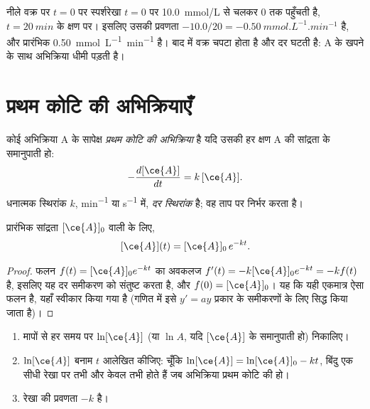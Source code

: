 \begin{example}[प्रारंभिक दर]\label{ex:g12:reaction-rates:initial}
नीले वक्र पर $t = 0$ पर स्पर्शरेखा
$t = 0$ पर \qty{10.0}{mmol/L} से चलकर $0$ तक पहुँचती है, $t = \qty{20}{min}$ के क्षण पर। इसलिए उसकी प्रवणता
$-10.0/20 = \qty{-0.50}{mmol.L^{-1}.min^{-1}}$ है, और प्रारंभिक
 \qty{0.50}{mmol.L^{-1}.min^{-1}} है। बाद में वक्र चपटा होता है
और दर घटती है: A के खपने के साथ अभिक्रिया धीमी पड़ती है।
\end{example}

\section{प्रथम कोटि की अभिक्रियाएँ}

\begin{definition}[प्रथम कोटि की अभिक्रिया, दर स्थिरांक]\label{def:g12:reaction-rates:first-order}
कोई अभिक्रिया A के सापेक्ष \emph{प्रथम कोटि की अभिक्रिया}
है यदि उसकी  हर क्षण A की सांद्रता के
समानुपाती हो:
\[
  -\frac{d[\ce{A}]}{dt} = k\,[\ce{A}] .
\]
धनात्मक स्थिरांक $k$, \si{min^{-1}} या \si{s^{-1}} में,
\emph{दर स्थिरांक} है; वह ताप पर निर्भर करता है।
\end{definition}

\begin{proposition}[चरघातांकी क्षय]\label{prop:g12:reaction-rates:exponential}
प्रारंभिक सांद्रता $[\ce{A}]_0$ वाली  के लिए,
\[
  [\ce{A}](t) = [\ce{A}]_0\, e^{-kt} .
\]
\end{proposition}

\begin{proof}
फलन $f(t) = [\ce{A}]_0 e^{-kt}$ का अवकलज
$f'(t) = -k [\ce{A}]_0 e^{-kt} = -k f(t)$ है, इसलिए यह दर
समीकरण को संतुष्ट करता है, और $f(0) = [\ce{A}]_0$। यह कि यही एकमात्र ऐसा फलन है,
यहाँ स्वीकार किया गया है (गणित में इसे $y' = ay$ प्रकार के समीकरणों के लिए सिद्ध किया जाता है)।
\end{proof}

\begin{method}[प्रथम कोटि की जाँच]\label{met:g12:reaction-rates:test}
\begin{enumerate}
  \item मापों से हर समय पर $\ln [\ce{A}]$ (या $\ln A$, यदि 
        $[\ce{A}]$ के समानुपाती हो) निकालिए।
  \item $\ln[\ce{A}]$ बनाम $t$ आलेखित कीजिए: चूँकि
        $\ln[\ce{A}] = \ln[\ce{A}]_0 - kt$, बिंदु एक सीधी
        रेखा पर तभी और केवल तभी होते हैं जब अभिक्रिया प्रथम कोटि की हो।
  \item रेखा की प्रवणता $-k$ है।
\end{enumerate}
\end{method}


